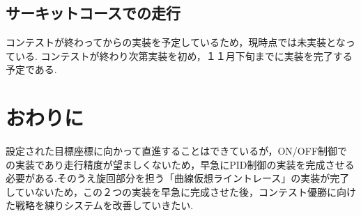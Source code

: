 \documentclass[submit,techrep,noauthor]{ipsj}
\begin{document}
\subsection{サーキットコースでの走行}
コンテストが終わってからの実装を予定しているため，現時点では未実装となっている.
コンテストが終わり次第実装を初め，１１月下旬までに実装を完了する予定である.


  


\label{config}






\section{おわりに}
設定された目標座標に向かって直進することはできているが，ON/OFF制御での実装であり走行精度が望ましくないため，早急にPID制御の実装を完成させる必要がある.そのうえ旋回部分を担う「曲線仮想ライントレース」の実装が完了していないため，この２つの実装を早急に完成させた後，コンテスト優勝に向けた戦略を練りシステムを改善していきたい.
\end{document}

